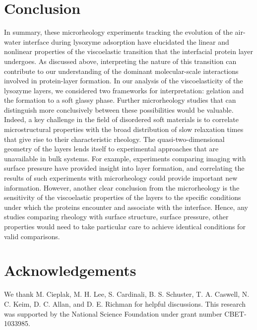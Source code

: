 \section{\label{sec:conclusion}Conclusion}

In summary, these microrheology experiments tracking the evolution of the air-water interface during lysozyme adsorption have elucidated the linear and nonlinear properties of the viscoelastic transition that the interfacial protein layer undergoes.  As discussed above, interpreting the nature of this transition can contribute to our understanding of the dominant molecular-scale interactions involved in protein-layer formation.  In our analysis of the viscoelasticity of the lysozyme layers, we considered two frameworks for interpretation:  gelation and the formation to a soft glassy phase.  Further microrheology studies that can distinguish more conclusively between these possibilities would be valuable.   Indeed, a key challenge in the field of disordered soft materials is to correlate microstructural properties with the broad distribution of slow relaxation times that give rise to their characteristic rheology.  The quasi-two-dimensional geometry of the layers lends itself to experimental approaches that are unavailable in bulk systems.  For example, experiments comparing imaging with surface pressure have provided insight into layer formation,\cite{Erickson2000} and correlating the results of such experiments with microrheology could provide important new information.  However, another clear conclusion from the microrheology is the sensitivity of the viscoelastic properties of the layers to the specific conditions under which the proteins encounter and associate with the interface.  Hence, any studies comparing rheology with surface structure, surface pressure, other properties would need to take particular care to achieve identical conditions for valid comparisons.

\section{Acknowledgements}
We thank M. Cieplak, M. H. Lee, S. Cardinali, B. S. Schuster, T. A. Caswell, N. C. Keim, D. C. Allan, and D. E. Richman for helpful discussions.  This research was supported by the National Science Foundation under grant number CBET-1033985.
